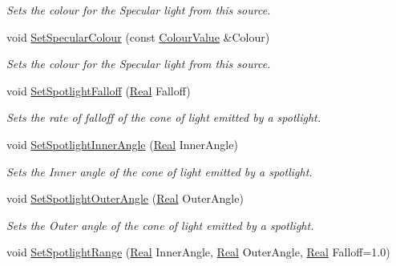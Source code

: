 \begin{DoxyCompactItemize}
\begin{DoxyCompactList}\small\item\em Sets the colour for the Specular light from this source. \item\end{DoxyCompactList}\item 
void \hyperlink{classMezzanine_1_1Light_a920d4d00a76b5643e3f7318a92011bbf}{SetSpecularColour} (const \hyperlink{classMezzanine_1_1ColourValue}{ColourValue} \&Colour)
\begin{DoxyCompactList}\small\item\em Sets the colour for the Specular light from this source. \item\end{DoxyCompactList}\item 
void \hyperlink{classMezzanine_1_1Light_aed419cb9a43757aa86c491fb4ad22132}{SetSpotlightFalloff} (\hyperlink{namespaceMezzanine_a726731b1a7df72bf3583e4a97282c6f6}{Real} Falloff)
\begin{DoxyCompactList}\small\item\em Sets the rate of falloff of the cone of light emitted by a spotlight. \item\end{DoxyCompactList}\item 
void \hyperlink{classMezzanine_1_1Light_acf532728dbcb894f4b3ada6492670ed2}{SetSpotlightInnerAngle} (\hyperlink{namespaceMezzanine_a726731b1a7df72bf3583e4a97282c6f6}{Real} InnerAngle)
\begin{DoxyCompactList}\small\item\em Sets the Inner angle of the cone of light emitted by a spotlight. \item\end{DoxyCompactList}\item 
void \hyperlink{classMezzanine_1_1Light_a149bd5af4b9120bab0703fc5ae638ac3}{SetSpotlightOuterAngle} (\hyperlink{namespaceMezzanine_a726731b1a7df72bf3583e4a97282c6f6}{Real} OuterAngle)
\begin{DoxyCompactList}\small\item\em Sets the Outer angle of the cone of light emitted by a spotlight. \item\end{DoxyCompactList}\item 
void \hyperlink{classMezzanine_1_1Light_a1f45a8de84131b1cea1566d7c175c597}{SetSpotlightRange} (\hyperlink{namespaceMezzanine_a726731b1a7df72bf3583e4a97282c6f6}{Real} InnerAngle, \hyperlink{namespaceMezzanine_a726731b1a7df72bf3583e4a97282c6f6}{Real} OuterAngle, \hyperlink{namespaceMezzanine_a726731b1a7df72bf3583e4a97282c6f6}{Real} Falloff=1.0)

\end{DoxyCompactItemize}
